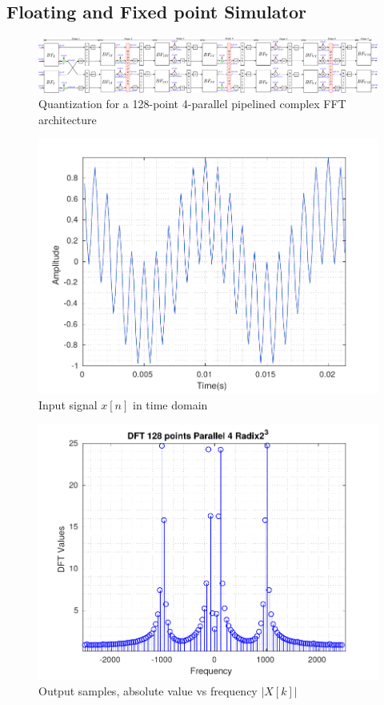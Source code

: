 \documentclass[journal,comsoc]{IEEEtran}
\begin{document}
\subsection{Floating and Fixed point Simulator}
\begin{figure}[t!]
	\centering
	\includegraphics[width=\linewidth]{Diagramas/miSeccionFiguras/4Paralelo128pRadix8Cuantizacion1}
	\caption{Quantization for a 128-point 4-parallel pipelined complex FFT architecture}
	\label{fig:4paralelo128pradix8cuantizacion1}
\end{figure}
\begin{figure}[t!]
	\centering
	\includegraphics[width=0.95\linewidth]{Diagramas/DftInputSignal}
	\caption{Input signal $x[n]$ in time domain}
	\label{fig:dftinputsignal}
\end{figure}
\begin{figure}[t!]
	\centering
	\includegraphics[width=\linewidth]{Diagramas/DftFixedPoint}
	\caption{Output samples, absolute value vs frequency $|X[k]|$}
	\label{fig:dftfixedpoint}
\end{figure}
\end{document}
